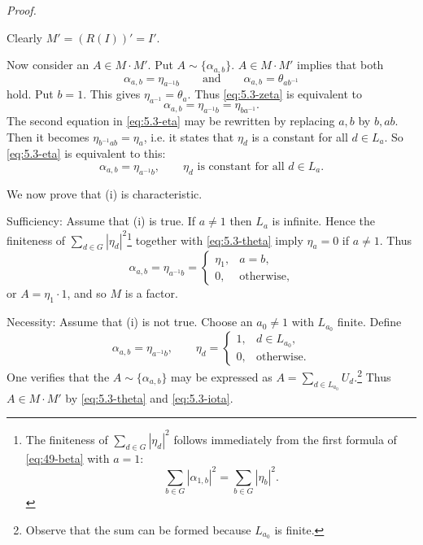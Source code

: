 \documentclass[b5paper,twoside]{article}
\theoremstyle{mvnplain}
\renewenvironment{proof}[1][Proof]{%
  \par\addvspace{0.35\baselineskip}%
  \noindent\textit{#1.}\ \normalfont\ignorespaces
}{%
  \par\addvspace{0.35\baselineskip}%
}
\newcommand{\M}{\mathbf M}
\newcommand{\R}{\mathbf R}
\def\M{M}%
\def\R{R}%
\def\mathfrak#1{#1}%
\begin{document}
\begin{proof}
Clearly \(\M'=(\R(I))'=I'\).

Now consider an \(A\in\M\cdot\M'\). Put
\(A\sim\{\alpha_{a,b}\}\). \(A\in\M\cdot\M'\) implies that both
\begin{equation}\tag{5.3.\(\zeta\)}\label{eq:5.3-zeta}
 \alpha_{a,b}=\eta_{a^{-1}b}
 \qquad\text{and}\qquad
 \alpha_{a,b}=\theta_{ab^{-1}}
\end{equation}
hold. Put \(b=1\). This gives \(\eta_{a^{-1}}=\theta_a\). Thus
\eqref{eq:5.3-zeta} is equivalent to
\begin{equation}\tag{5.3.\(\eta\)}\label{eq:5.3-eta}
 \alpha_{a,b}=\eta_{a^{-1}b}=\eta_{ba^{-1}}.
\end{equation}
The second equation in \eqref{eq:5.3-eta} may be rewritten by replacing
\(a,b\) by \(b,ab\). Then it becomes \(\eta_{b^{-1}ab}=\eta_a\), i.e. it
states that \(\eta_d\) is a constant for all \(d\in\mathfrak L_a\). So
\eqref{eq:5.3-eta} is equivalent to this:
\begin{equation}\tag{5.3.\(\theta\)}\label{eq:5.3-theta}
 \alpha_{a,b}=\eta_{a^{-1}b},\qquad
 \eta_d\text{ is constant for all }d\in\mathfrak L_a.
\end{equation}

We now prove that (i) is characteristic.

Sufficiency: Assume that (i) is true. If \(a\ne1\) then
\(\mathfrak L_a\) is infinite. Hence the finiteness of
\(\sum_{d\in\mathfrak G}|\eta_d|^2\)\footnote{The finiteness of
\(\sum_{d\in\mathfrak G}|\eta_d|^2\) follows immediately from the first
formula of \eqref{eq:49-beta} with \(a=1\):
\[
 \sum_{b\in\mathfrak G}|\alpha_{1,b}|^2
 =\sum_{b\in\mathfrak G}|\eta_b|^2.
\]} together with \eqref{eq:5.3-theta} imply \(\eta_a=0\) if \(a\ne1\).
Thus
\[
 \alpha_{a,b}=\eta_{a^{-1}b}
 =\begin{cases}\eta_1,&a=b,\\0,&\text{otherwise},\end{cases}
\]
or \(A=\eta_1\cdot1\), and so \(\M\) is a factor.

Necessity: Assume that (i) is not true. Choose an \(a_0\ne1\) with
\(\mathfrak L_{a_0}\) finite. Define
\begin{equation}\tag{5.3.\(\iota\)}\label{eq:5.3-iota}
 \alpha_{a,b}=\eta_{a^{-1}b},\qquad
 \eta_d=\begin{cases}1,&d\in\mathfrak L_{a_0},\\0,&\text{otherwise}.
 \end{cases}
\end{equation}
One verifies that the \(A\sim\{\alpha_{a,b}\}\) may be expressed as
\(A=\sum_{d\in\mathfrak L_{a_0}}U_d\).\footnote{Observe that the sum can
be formed because \(\mathfrak L_{a_0}\) is finite.} Thus
\(A\in\M\cdot\M'\) by \eqref{eq:5.3-theta} and \eqref{eq:5.3-iota}.


\end{proof}
\end{document}
